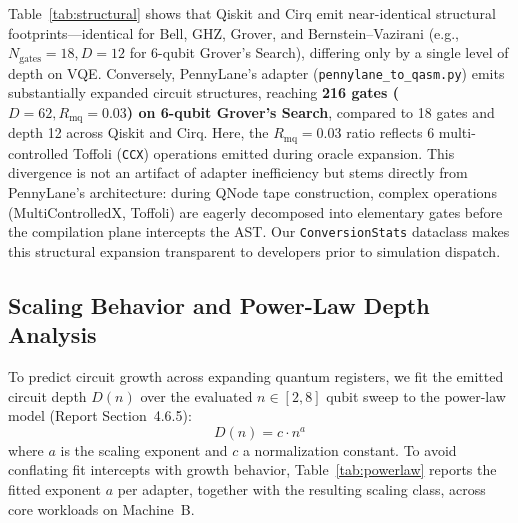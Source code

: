 \documentclass[runningheads]{llncs}
\begin{document}
Table~\ref{tab:structural} shows that Qiskit and Cirq emit near-identical structural footprints---identical for Bell, GHZ, Grover, and Bernstein--Vazirani (e.g., $N_{\text{gates}} = 18, D=12$ for 6-qubit Grover's Search), differing only by a single level of depth on VQE. Conversely, PennyLane's adapter (\texttt{pennylane\_to\_qasm.py}) emits substantially expanded circuit structures, reaching \textbf{216 gates ($D=62, R_{\text{mq}}=0.03$) on 6-qubit Grover's Search}, compared to 18 gates and depth 12 across Qiskit and Cirq. Here, the $R_{\text{mq}}=0.03$ ratio reflects 6 multi-controlled Toffoli (\texttt{CCX}) operations emitted during oracle expansion. This divergence is not an artifact of adapter inefficiency but stems directly from PennyLane's architecture: during QNode tape construction, complex operations (MultiControlledX, Toffoli) are eagerly decomposed into elementary gates before the compilation plane intercepts the AST. Our \texttt{ConversionStats} dataclass makes this structural expansion transparent to developers prior to simulation dispatch.

\subsection{Scaling Behavior and Power-Law Depth Analysis}

To predict circuit growth across expanding quantum registers, we fit the emitted circuit depth $D(n)$ over the evaluated $n \in [2, 8]$ qubit sweep to the power-law model (Report Section~4.6.5):
\begin{equation}
D(n) = c \cdot n^a
\end{equation}
where $a$ is the scaling exponent and $c$ a normalization constant. To avoid conflating fit intercepts with growth behavior, Table~\ref{tab:powerlaw} reports the fitted exponent $a$ per adapter, together with the resulting scaling class, across core workloads on Machine~B.
\end{document}
